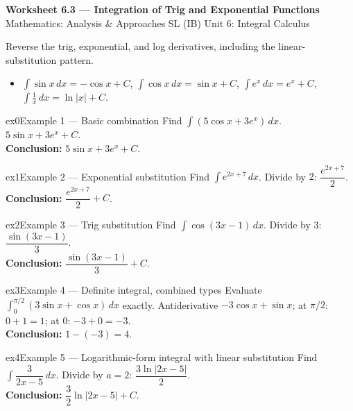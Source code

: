 \documentclass[11pt]{article}
\begin{document}
\begin{center}
{\LARGE\bfseries\color{titleblue}Worksheet 6.3 --- Integration of Trig and Exponential Functions}\\[2pt]
{\small Mathematics: Analysis \& Approaches SL (IB) \textperiodcentered{} Unit 6: Integral Calculus}
\end{center}

\begin{ideabox}
Reverse the trig, exponential, and log derivatives, including the linear-substitution pattern.
\begin{itemize}[leftmargin=*,itemsep=2pt]
  \item $\displaystyle\int\sin x\,dx=-\cos x+C$, $\int\cos x\,dx=\sin x+C$, $\int e^x\,dx=e^x+C$, $\int\tfrac1x\,dx=\ln|x|+C$.
\end{itemize}
\end{ideabox}


\begin{example}{ex0}{Example 1 --- Basic combination}
Find $\displaystyle\int(5\cos x+3e^x)\,dx$.\soln
$5\sin x+3e^x+C$.\\[3pt]\textbf{Conclusion:} $5\sin x+3e^x+C$.
\end{example}

\begin{example}{ex1}{Example 2 --- Exponential substitution}
Find $\displaystyle\int e^{2x+7}\,dx$.\soln
Divide by $2$: $\dfrac{e^{2x+7}}{2}$.\\[3pt]\textbf{Conclusion:} $\dfrac{e^{2x+7}}{2}+C$.
\end{example}

\begin{example}{ex2}{Example 3 --- Trig substitution}
Find $\displaystyle\int\cos(3x-1)\,dx$.\soln
Divide by $3$: $\dfrac{\sin(3x-1)}{3}$.\\[3pt]\textbf{Conclusion:} $\dfrac{\sin(3x-1)}{3}+C$.
\end{example}

\begin{example}{ex3}{Example 4 --- Definite integral, combined types}
Evaluate $\displaystyle\int_0^{\pi/2}(3\sin x+\cos x)\,dx$ exactly.\soln
Antiderivative $-3\cos x+\sin x$; at $\pi/2$: $0+1=1$; at $0$: $-3+0=-3$.\\[3pt]\textbf{Conclusion:} $1-(-3)=4$.
\end{example}

\begin{example}{ex4}{Example 5 --- Logarithmic-form integral with linear substitution}
Find $\displaystyle\int\dfrac{3}{2x-5}\,dx$.\soln
Divide by $a=2$: $\dfrac{3\ln|2x-5|}{2}$.\\[3pt]\textbf{Conclusion:} $\dfrac32\ln|2x-5|+C$.
\end{example}
\end{document}
